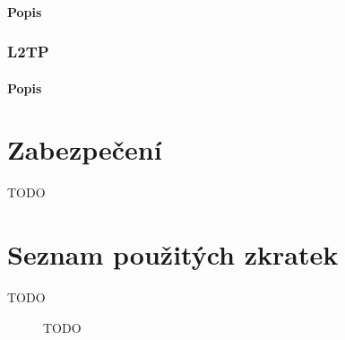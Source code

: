 \documentclass[thesis=B,czech]{FITthesis}[2012/06/26]
\begin{document}
      \subsubsection{Popis}
        \cite{pptp_basics}

    \subsection{L2TP}

      \subsubsection{Popis}
        \cite{l2tp_basics}

\chapter{Zabezpečení}

\begin{conclusion}

    TODO

\end{conclusion}




\appendix

\chapter{Seznam použitých zkratek}
\begin{description}

    \item[TODO] TODO

\end{description}
\end{document}
